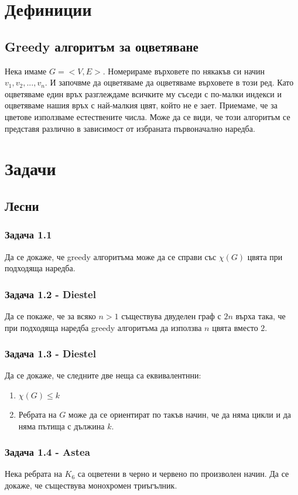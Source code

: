 \documentclass[12pt]{article}
\begin{document}
\section*{Дефиниции}
\subsection*{Greedy алгоритъм за оцветяване}
Нека имаме $G = <V, E>$. Номерираме върховете по някакъв си начин $v_1, v_2, ..., v_{n}$. И започвме да оцветяваме да оцветяваме върховете в този ред. Като оцветяваме един връх разглеждаме всичките му съседи с по-малки индекси и оцветяваме нашия връх с най-малкия цвят, който не е зает. Приемаме, че за цветове използваме естествените числа. Може да се види, че този алгоритъм се представя различно в зависимост от избраната първоначално наредба.

\section*{Задачи}

\subsection*{Лесни} 
\subsubsection*{Задача 1.1}
Да се докаже, че greedy алгоритъма може да се справи със $\chi(G)$ цвята при подходяща наредба.
\subsubsection*{Задача 1.2 - Diestel}
Да се покаже, че за всяко $n > 1$ съществува двуделен граф с $2n$ върха така, че при подходяща наредба greedy алгоритъма да използва $n$ цвята вместо $2$.
\subsubsection*{Задача 1.3 - Diestel}
Да се докаже, че следните две неща са еквивалентнни:
\begin{enumerate}
    \item $\chi(G) \leq k$
    \item Ребрата на $G$ може да се ориентират по такъв начин, че да няма цикли и да няма пътища с дължина $k$.
\end{enumerate}
\subsubsection*{Задача 1.4 - Astea}
Нека ребрата на $K_6$ са оцветени в черно и червено по произволен начин. Да се докаже, че съществува монохромен триъгълник.
\end{document}
